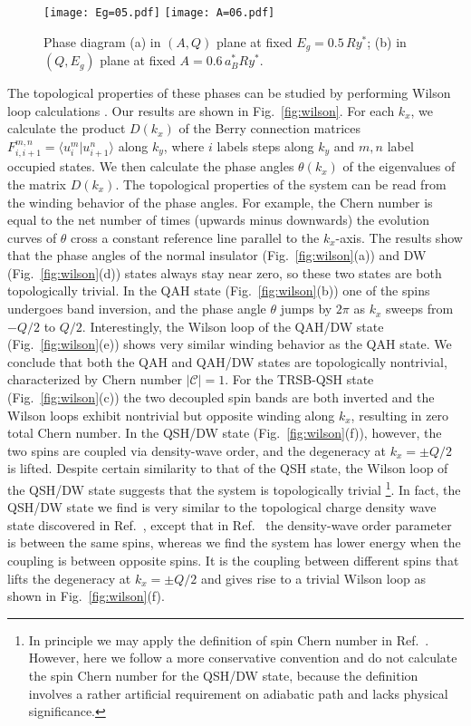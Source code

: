 \documentclass[reprint,aps,superscriptaddress]{revtex4-2}
\begin{document}
\begin{figure*}
\centering
\texttt{[image: Eg=05.pdf]}
\texttt{[image: A=06.pdf]}
\caption{Phase diagram (a) in $(A,Q)$ plane at fixed $E_g=0.5\,Ry^*$; (b) in $(Q,E_g)$ plane at fixed $A=0.6\,a_B^* Ry^*$.} \label{fig:phase_varyQ}
\end{figure*}

The topological properties of these phases can be studied by performing Wilson loop calculations \cite{yu2011equivalent,weng2015quantum}.  Our results are shown in Fig.~\ref{fig:wilson}. 
For each $k_x$, we calculate the product $D(k_x)$ of the Berry connection matrices $F_{i,i+1}^{m,n} = \langle u_i^m | u_{i+1}^n \rangle$ along $k_y$, where $i$ labels steps along $k_y$ and $m,n$ label occupied states.  
We then calculate the phase angles $\theta(k_x)$ of the eigenvalues of the matrix $D(k_x)$. The topological properties of the system can be read from the winding behavior of the phase angles. For example, the Chern number is equal to the net number of times (upwards minus downwards) the evolution curves of $\theta$ cross a constant reference line parallel to the $k_x$-axis. The results show that the phase angles of the normal insulator (Fig.~\ref{fig:wilson}(a)) and DW (Fig.~\ref{fig:wilson}(d)) states always stay near zero, so these two states are both topologically trivial. In the QAH state (Fig.~\ref{fig:wilson}(b)) one of the spins undergoes band inversion, and the phase angle $\theta$ jumps by $2\pi$ as $k_x$ sweeps from $-Q/2$ to $Q/2$. Interestingly, the Wilson loop of the QAH/DW state (Fig.~\ref{fig:wilson}(e)) shows very similar winding behavior as the QAH state. We conclude that both the QAH and QAH/DW states are topologically nontrivial, characterized by Chern number $|\mathcal C|=1$. For the TRSB-QSH state (Fig.~\ref{fig:wilson}(c)) the two decoupled spin bands are both inverted and the Wilson loops exhibit nontrivial but opposite winding along $k_x$, resulting in zero total Chern number. In the QSH/DW state (Fig.~\ref{fig:wilson}(f)), however, the two spins are coupled via density-wave order, and the degeneracy at $k_x=\pm Q/2$ is lifted. Despite certain similarity to that of the QSH state, the Wilson loop of the QSH/DW state suggests that the system is topologically trivial \footnote{In principle we may apply the definition of spin Chern number in Ref.~. However, here we follow a more conservative convention and do not calculate the spin Chern number for the QSH/DW state, because the definition involves a rather artificial requirement on adiabatic path \cite{vanderbilt2018berry} and lacks physical significance.}. In fact, the QSH/DW state we find is very similar to the topological charge density wave state discovered in Ref.~, except that in Ref.~ the density-wave order parameter is between the same spins, whereas we find the system has lower energy when the coupling is between opposite spins. It is the coupling between different spins that lifts the degeneracy at $k_x=\pm Q/2$ and gives rise to a trivial Wilson loop as shown in Fig.~\ref{fig:wilson}(f). %
\end{document}
